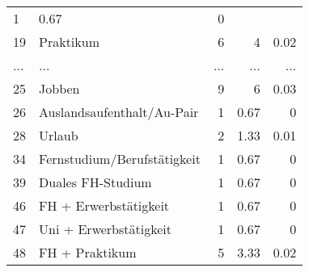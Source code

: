 \begin{longtable}{lXrrr}
          \num{1} &
          \num[round-mode=places,round-precision=2]{0,67} &
          \num[round-mode=places,round-precision=2]{0} \\
        19 & \multicolumn{1}{X}{Praktikum} & %
          \num{6} &
          \num[round-mode=places,round-precision=2]{4} &
          \num[round-mode=places,round-precision=2]{0,02} \\
       ... & ... & ... & ... & ... \\
        25 & \multicolumn{1}{X}{Jobben} & %
          \num{9} &
          \num[round-mode=places,round-precision=2]{6} &
          \num[round-mode=places,round-precision=2]{0,03} \\

        26 & \multicolumn{1}{X}{Auslandsaufenthalt/Au-Pair} & %
          \num{1} &
          \num[round-mode=places,round-precision=2]{0,67} &
          \num[round-mode=places,round-precision=2]{0} \\

        28 & \multicolumn{1}{X}{Urlaub} & %
          \num{2} &
          \num[round-mode=places,round-precision=2]{1,33} &
          \num[round-mode=places,round-precision=2]{0,01} \\

        34 & \multicolumn{1}{X}{Fernstudium/Berufstätigkeit} & %
          \num{1} &
          \num[round-mode=places,round-precision=2]{0,67} &
          \num[round-mode=places,round-precision=2]{0} \\

        39 & \multicolumn{1}{X}{Duales FH-Studium} & %
          \num{1} &
          \num[round-mode=places,round-precision=2]{0,67} &
          \num[round-mode=places,round-precision=2]{0} \\

        46 & \multicolumn{1}{X}{FH + Erwerbstätigkeit} & %
          \num{1} &
          \num[round-mode=places,round-precision=2]{0,67} &
          \num[round-mode=places,round-precision=2]{0} \\

        47 & \multicolumn{1}{X}{Uni + Erwerbstätigkeit} & %
          \num{1} &
          \num[round-mode=places,round-precision=2]{0,67} &
          \num[round-mode=places,round-precision=2]{0} \\

        48 & \multicolumn{1}{X}{FH + Praktikum} & %
          \num{5} &
          \num[round-mode=places,round-precision=2]{3,33} &
          \num[round-mode=places,round-precision=2]{0,02} \\


\end{longtable}
